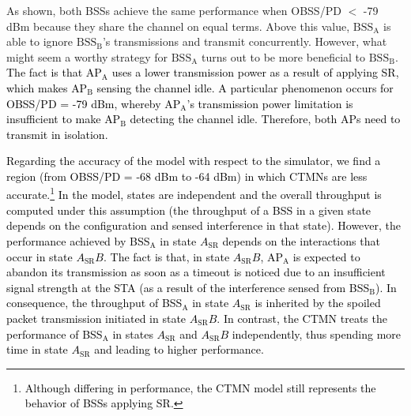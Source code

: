 \documentclass[preprint,12pt]{elsarticle}
\theoremstyle{plain}
\begin{document}
As shown, both BSSs achieve the same performance when OBSS/PD $<$ -79 dBm because they share the channel on equal terms. Above this value, $\text{BSS}_\text{A}$ is able to ignore $\text{BSS}_\text{B}$'s transmissions and transmit concurrently. However, what might seem a worthy strategy for $\text{BSS}_\text{A}$ turns out to be more beneficial to $\text{BSS}_\text{B}$. \textcolor{black}{The fact is that $\text{AP}_\text{A}$ uses a lower transmission power as a result of applying SR, which makes $\text{AP}_\text{B}$ sensing the channel idle. A particular phenomenon occurs for OBSS/PD = -79 dBm, whereby $\text{AP}_\text{A}$'s transmission power limitation is insufficient to make $\text{AP}_\text{B}$ detecting the channel idle. Therefore, both APs need to transmit in isolation.} 

\textcolor{black}{Regarding the accuracy of the model with respect to the simulator, we find a region (from OBSS/PD = -68 dBm to -64 dBm) in which CTMNs are less accurate.\footnote{\textcolor{black}{Although differing in performance, the CTMN model still represents the behavior of BSSs applying SR.}} In the model, states are independent and the overall throughput is computed under this assumption (the throughput of a BSS in a given state depends on the configuration and sensed interference in that state). However, the performance achieved by BSS$_\text{A}$ in state $A_\text{SR}$ depends on the interactions that occur in state $A_\text{SR}B$. The fact is that, in state $A_\text{SR}B$, $\text{AP}_\text{A}$ is expected to abandon its transmission as soon as a timeout is noticed due to an insufficient signal strength at the STA (as a result of the interference sensed from BSS$_\text{B}$). In consequence, the throughput of BSS$_\text{A}$ in state $A_\text{SR}$ is inherited by the spoiled packet transmission initiated in state $A_\text{SR}B$. In contrast, the CTMN treats the performance of BSS$_\text{A}$ in states $A_\text{SR}$ and $A_\text{SR}B$ independently, thus spending more time in state $A_\text{SR}$ and leading to higher performance.}

\end{document}
